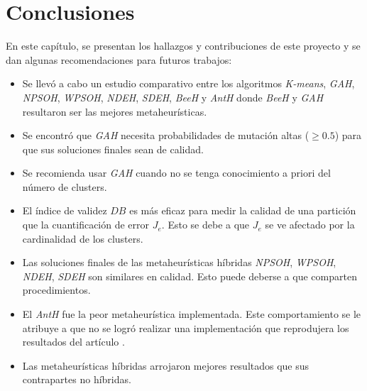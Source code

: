 \chapter{Conclusiones} \label{chap:conclusiones}

    En este capítulo, se presentan los hallazgos y contribuciones de este
proyecto y se dan algunas recomendaciones para futuros trabajos:
\begin{comment}
    Se evaluó el desempeño de los algoritmos \emph{K-means}, \emph{GAH},
\emph{NPSOH}, \emph{WPSOH}, \emph{NDEH}, \emph{SDEH}, \emph{BeeH}, \emph{AntH}.
Estos ocho algoritmos fueron comparados mediante el índice de validez $DB$ y la
cuantificación del error $J_e$ para determinar la calidad de sus soluciones
finales. Además, se comparó el rendimiento de las metaheurísticas \emph{GAH} y
\emph{BeeH} por medio de la cantidad de evaluaciones de su función de \emph{fitness}.
Así que, en función del análisis hecho en el capítulo anterior (ver capítulo \ref{chap:analisis}),
se puede concluir:
\end{comment}

\begin{itemize}
    \item Se llevó a cabo un estudio comparativo entre los algoritmos \emph{K-means},
          \emph{GAH}, \emph{NPSOH}, \emph{WPSOH}, \emph{NDEH}, \emph{SDEH},
          \emph{BeeH} y \emph{AntH} donde \emph{BeeH} y \emph{GAH} resultaron
          ser las mejores metaheurísticas.

    \item Se encontró que \emph{GAH} necesita probabilidades de mutación altas
          ($\geq 0.5$) para que sus soluciones finales sean de calidad.

    \item Se recomienda usar \emph{GAH} cuando no se tenga conocimiento a priori
          del número de clusters.

    \item El índice de validez $DB$ es más eficaz para medir la calidad de una
          partición que la cuantificación de error $J_e$. Esto se debe a que $J_e$
          se ve afectado por la cardinalidad de los clusters.

    \item Las soluciones finales de las metaheurísticas híbridas \emph{NPSOH},
          \emph{WPSOH}, \emph{NDEH}, \emph{SDEH} son similares en calidad. Esto
          puede deberse a que comparten procedimientos.

    \item El \emph{AntH} fue la peor metaheurística implementada. Este comportamiento
          se le atribuye a que no se logró realizar una implementación que
          reprodujera los resultados del artículo \cite{OuBa2007}.

    \item Las metaheurísticas híbridas arrojaron mejores resultados que sus
          contrapartes no híbridas.
          
\end{itemize}

